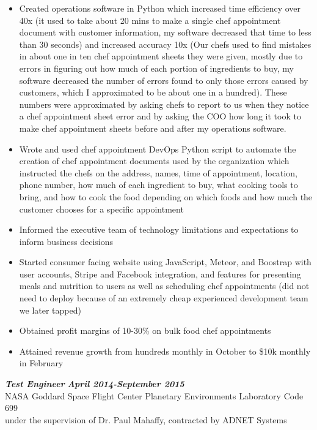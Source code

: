 \documentclass{res}
\begin{document}
\begin{resume}
\begin{itemize}
		\item Created operations software in Python which increased time efficiency over 40x (it used to take about 20 mins to make a single chef appointment document with customer information, my software decreased that time to less than 30 seconds) and increased accuracy 10x (Our chefs used to find mistakes in about one in ten chef appointment sheets they were given, mostly due to errors in figuring out how much of each portion of ingredients to buy, my software decreased the number of errors found to only those errors caused by customers, which I approximated to be about one in a hundred). These numbers were approximated by asking chefs to report to us when they notice a chef appointment sheet error and by asking the COO how long it took to make chef appointment sheets before and after my operations software.
		\item Wrote and used chef appointment DevOps Python script to automate the creation of chef appointment documents used by the organization which instructed the chefs on the address, names, time of appointment, location, phone number, how much of each ingredient to buy, what cooking tools to bring, and how to cook the food depending on which foods and how much the customer chooses for a specific appointment
		\item Informed the executive team of technology limitations and expectations to inform business decisions
		\item Started consumer facing website using JavaScript, Meteor, and Boostrap with user accounts, Stripe and Facebook integration, and features for presenting meals and nutrition to users as well as scheduling chef appointments (did not need to deploy because of an extremely cheap experienced development team we later tapped)
                \item Obtained profit margins of 10-30\% on bulk food chef appointments
		\item Attained revenue growth from hundreds monthly in October to \$10k monthly in February
                \end{itemize}
	{\bfseries {\em Test Engineer}}  \hfill  {\bfseries{\em April 2014-September 2015}}\\
		NASA Goddard Space Flight Center Planetary Environments Laboratory Code 699\\
                under the supervision of Dr. Paul Mahaffy, contracted by ADNET Systems
                \begin{itemize}  \itemsep -2pt %

\end{itemize}
\end{resume}
\end{document}
